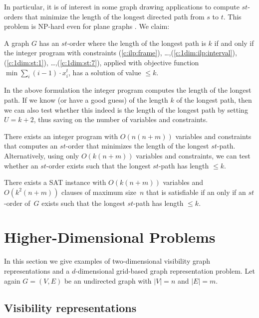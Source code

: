 \documentclass[runningheads]{llncs}
\newcounter{constr}
\begin{document}
In particular, it is of interest in some graph drawing applications
to compute $st$-orders that minimize the length of the longest
directed path from $s$ to $t$.  This problem is NP-hard even for
plane graphs \cite{SZ10}.
We claim:
\newcommand{\lemMinStText}{A graph $G$ has an $st$-order where the length of the longest path
is $k$ if and only if the integer program
with constraints (\ref{c:ilp:frame}),
\ldots,(\ref{c:1dim:ilp:interval}),
(\ref{c:1dim:st:1}),
\ldots,(\ref{c:1dim:st:7}),
 applied with 
objective function $\min \sum_i (i-1)\cdot x_i^t$, has a solution
of value $\leq k$.}
\begin{lemma}
 \lemMinStText
 \label{le:minSt}
\end{lemma}
In the above formulation the integer program computes the length
of the longest path.  If we know (or have a good guess) of the length
$k$ of the longest path, then we can also test whether this indeed
is the length of the longest path by setting $U=k+2$,
thus saving on the number of variables and constraints.

\begin{theorem}
There exists an integer program with $O(n(n+m))$ variables
and constraints that computes an $st$-order that minimizes
the length of the longest $st$-path.  Alternatively, using only
$O(k(n+m))$ variables and constraints, we can test whether
an $st$-order exists such that the longest $st$-path has length $\leq k$.
\end{theorem}
\begin{theorem}
There exists a SAT instance with $O(k(n+m))$ variables
and $O(k^2(n+m))$ clauses of maximum size~$n$
that is satisfiable if an only if
an $st$-order of~$G$ exists such that the longest $st$-path has length $\leq k$.
\end{theorem}


\fi


\section{Higher-Dimensional Problems}\label{sec:higherdim}
In this section we give examples of two-dimensional visibility graph representations and a $d$-dimensional grid-based graph representation problem. Let again $G=(V,E)$ be an undirected graph with $|V|=n$ and $|E|=m$.

\subsection{Visibility representations}
\end{document}
